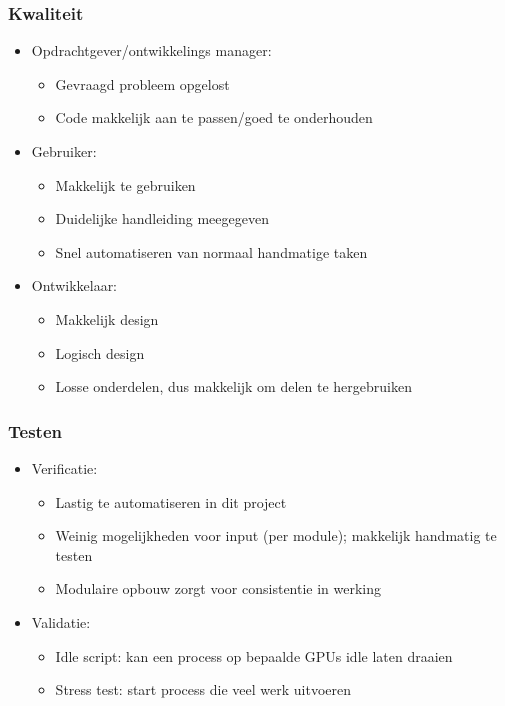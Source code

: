 \documentclass{beamer}
\begin{document}
\begin{frame}
\frametitle{Kwaliteit}
    \begin{itemize}
        \item Opdrachtgever/ontwikkelings manager:
        \begin{itemize}
            \item Gevraagd probleem opgelost
            \item Code makkelijk aan te passen/goed te onderhouden  %
        \end{itemize}
        \vspace{+1mm}

        \item Gebruiker:
        \begin{itemize}
            \item Makkelijk te gebruiken  %
            \item Duidelijke handleiding meegegeven  %
            \item Snel automatiseren van normaal handmatige taken  %
        \end{itemize}
        \vspace{+1mm}

        \item Ontwikkelaar:
        \begin{itemize}
            \item Makkelijk design  %
            \item Logisch design  %
            \item Losse onderdelen, dus makkelijk om delen te hergebruiken  %
        \end{itemize}
    \end{itemize}
\end{frame}


\begin{frame}
\frametitle{Testen}
    \begin{itemize}
        \item Verificatie:
        \begin{itemize}
            \item Lastig te automatiseren in dit project
            \item Weinig mogelijkheden voor input (per module); makkelijk handmatig te testen
            \item Modulaire opbouw zorgt voor consistentie in werking
        \end{itemize}
        \vspace{+2mm}

        \item Validatie:
        \begin{itemize}
            \item Idle script: kan een process op bepaalde GPUs idle laten draaien
            \item Stress test: start process die veel werk uitvoeren
        \end{itemize}
    \end{itemize}
\end{frame}
\end{document}
